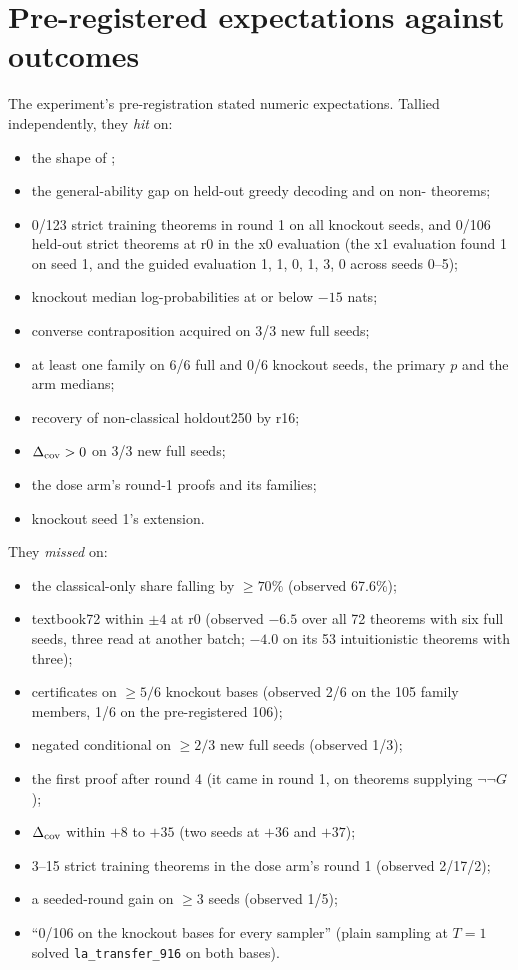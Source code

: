 \section{Pre-registered expectations against outcomes}
\label{app:expectations}
The experiment's pre-registration stated numeric expectations. Tallied independently, they \emph{hit} on:
\begin{itemize}
\item the shape of \KTko{};
\item the general-ability gap on held-out greedy decoding and on non-\sig{} theorems;
\item 0/123 strict training theorems in round 1 on all knockout seeds, and 0/106 held-out strict theorems at r0 in the
x0 evaluation (the x1 evaluation found 1 on seed 1, and the guided evaluation 1, 1, 0, 1, 3, 0 across seeds 0--5);
\item knockout median log-probabilities at or below $-15$ nats;
\item converse contraposition acquired on 3/3 new full seeds;
\item at least one family on 6/6 full and 0/6 knockout seeds, the primary $p$ and the arm medians;
\item recovery of non-classical holdout250 by r16;
\item $\Delta_{\mathrm{cov}} > 0$ on 3/3 new full seeds;
\item the dose arm's round-1 \sig{} proofs and its families;
\item knockout seed 1's extension.
\end{itemize}
They \emph{missed} on:
\begin{itemize}
\item the classical-only share falling by $\geq 70\%$ (observed 67.6\%);
\item textbook72 within $\pm4$ at r0 (observed $-6.5$ over all 72 theorems with six full seeds, three read at another
batch; $-4.0$ on its 53 intuitionistic theorems with three);
\item certificates on $\geq 5/6$ knockout bases (observed 2/6 on the 105 family members, 1/6 on the pre-registered
106);
\item negated conditional on $\geq 2/3$ new full seeds (observed 1/3);
\item the first \sigp{} proof after round 4 (it came in round 1, on theorems supplying $\neg\neg G$);
\item $\Delta_{\mathrm{cov}}$ within $+8$ to $+35$ (two seeds at $+36$ and $+37$);
\item 3--15 strict training theorems in the dose arm's round 1 (observed 2/17/2);
\item a seeded-round gain on $\geq 3$ seeds (observed 1/5);
\item ``0/106 on the knockout bases for every sampler'' (plain sampling at $T=1$ solved \texttt{la\_transfer\_916} on
both bases).
\end{itemize}
